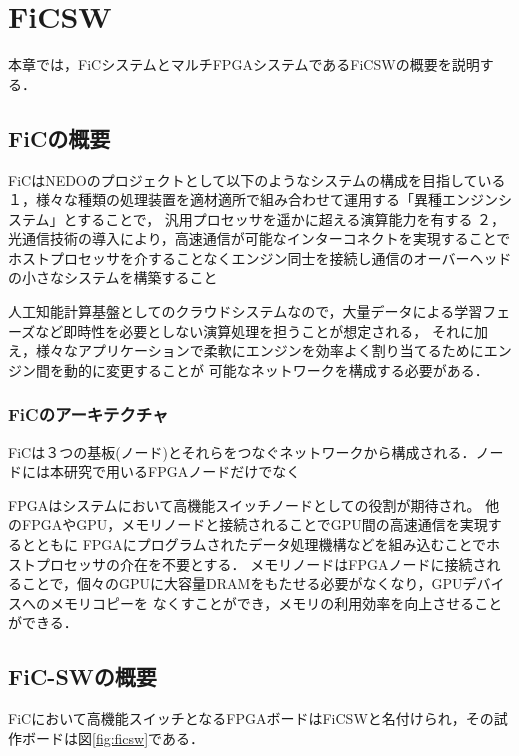 \chapter{FiCSW}
{
\label{chap:ficsw}
本章では，FiCシステムとマルチFPGAシステムであるFiCSWの概要を説明する．

\section{FiCの概要}
\label{sec:about_fic}
FiCはNEDOのプロジェクトとして以下のようなシステムの構成を目指している
１，様々な種類の処理装置を適材適所で組み合わせて運用する「異種エンジンシステム」とすることで，
汎用プロセッサを遥かに超える演算能力を有する
２，光通信技術の導入により，高速通信が可能なインターコネクトを実現することで
ホストプロセッサを介することなくエンジン同士を接続し通信のオーバーヘッドの小さなシステムを構築すること

人工知能計算基盤としてのクラウドシステムなので，大量データによる学習フェーズなど即時性を必要としない演算処理を担うことが想定される，
それに加え，様々なアプリケーションで柔軟にエンジンを効率よく割り当てるためにエンジン間を動的に変更することが
可能なネットワークを構成する必要がある．

\subsection{FiCのアーキテクチャ}
\label{sec:arch_fic}
FiCは３つの基板(ノード)とそれらをつなぐネットワークから構成される．ノードには本研究で用いるFPGAノードだけでなく


FPGAはシステムにおいて高機能スイッチノードとしての役割が期待され。
他のFPGAやGPU，メモリノードと接続されることでGPU間の高速通信を実現するとともに
FPGAにプログラムされたデータ処理機構などを組み込むことでホストプロセッサの介在を不要とする．
メモリノードはFPGAノードに接続されることで，個々のGPUに大容量DRAMをもたせる必要がなくなり，GPUデバイスへのメモリコピーを
なくすことができ，メモリの利用効率を向上させることができる．

\section{FiC-SWの概要}
\label{sec:about_ficsw}
FiCにおいて高機能スイッチとなるFPGAボードはFiCSWと名付けられ，その試作ボードは図\ref{fig:ficsw}である．

}
